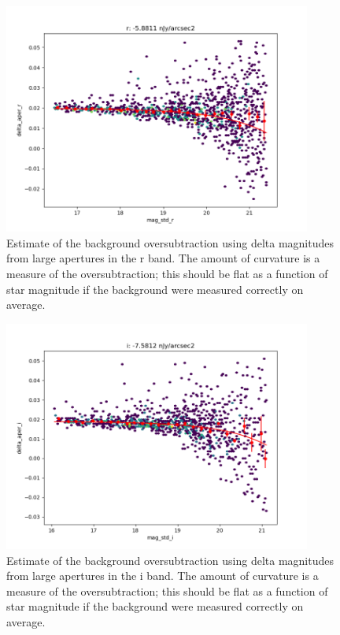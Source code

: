 \begin{figure}
  \begin{center}
    \includegraphics[width=0.9\textwidth]{photometric_calibration_figures/background_oversubtraction_r.png}
  \end{center}
  \caption{Estimate of the background oversubtraction using delta magnitudes
    from large apertures in the r band.  The amount of curvature is a measure
    of the oversubtraction; this should be flat as a function of star magnitude
    if the background were measured correctly on average.}
\end{figure}

\begin{figure}
  \begin{center}
    \includegraphics[width=0.9\textwidth]{photometric_calibration_figures/background_oversubtraction_i.png}
  \end{center}
  \caption{Estimate of the background oversubtraction using delta magnitudes
    from large apertures in the i band.  The amount of curvature is a measure
    of the oversubtraction; this should be flat as a function of star magnitude
    if the background were measured correctly on average.}
\end{figure}

